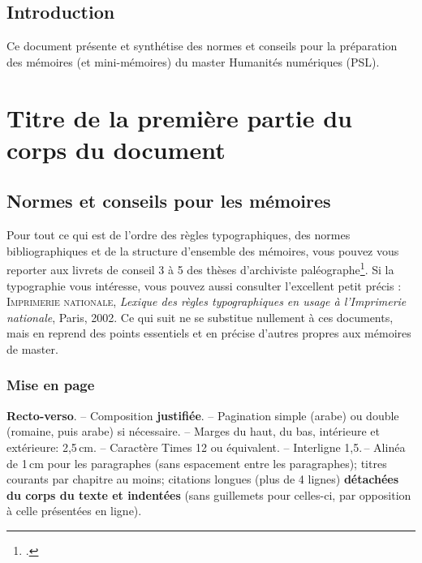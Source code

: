 \documentclass[a4paper,twoside,12pt]{book}
\begin{document}
\chapter*{Introduction}

Ce document présente et synthétise des normes et conseils pour la préparation des mémoires (et mini-mémoires) du master Humanités numériques (PSL).

\printbibliography

\mainmatter

\part{Titre de la première partie du corps du document}

\chapter{Normes et conseils pour les mémoires}

Pour tout ce qui est de l'ordre des règles typographiques, des normes bibliographiques et de la structure d'ensemble des mémoires, vous pouvez vous reporter aux livrets de conseil 3 à 5 des thèses d'archiviste paléographe\footcites{smith_conseils_3,smith_conseils_4,smith_conseils_5}.
Si la typographie vous intéresse, vous pouvez aussi consulter  l'excellent petit  précis :
\textsc{Imprimerie nationale}, \textit{Lexique des règles typographiques en usage à l'Imprimerie nationale}, Paris, 2002. 
Ce qui suit ne se substitue nullement à ces documents, mais en reprend des points essentiels et en précise d'autres propres aux mémoires de master.


\section{Mise en page}
\textbf{Recto-verso}. -- Composition \textbf{justifiée}. -- Pagination simple (arabe) ou double (romaine, puis arabe) si nécessaire. -- Marges du haut, du bas, intérieure et extérieure: 2,5\,cm. -- Caractère Times 12 ou équivalent. -- Interligne 1,5.\,-- Alinéa de 1\,cm pour les paragraphes (sans espacement entre les paragraphes); titres courants par chapitre au moins; citations longues (plus de 4 lignes) \textbf{détachées du corps du texte et indentées} (sans guillemets pour celles-ci, par opposition à celle présentées en ligne).
\end{document}
